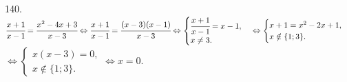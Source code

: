 140. $\cfrac{x+1}{x-1}=\cfrac{x^2-4x+3}{x-3}\Leftrightarrow
\cfrac{x+1}{x-1}=\cfrac{(x-3)(x-1)}{x-3}\Leftrightarrow
\begin{cases} \cfrac{x+1}{x-1}=x-1,\\ x\neq3.\end{cases}\Leftrightarrow
\begin{cases} x+1=x^2-2x+1,\\ x\notin\{1;3\}.\end{cases}$\\$\Leftrightarrow
\begin{cases} x(x-3)=0,\\ x\notin\{1;3\}.\end{cases}\Leftrightarrow x=0.$\\
